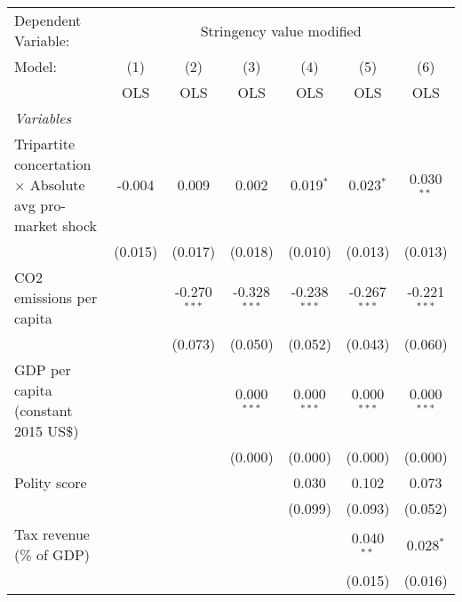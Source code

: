 
\begingroup
\centering
\begin{tabular}{lcccccc}
   \toprule
   Dependent Variable: & \multicolumn{6}{c}{Stringency value modified}\\
   Model:                                                          & (1)     & (2)            & (3)            & (4)            & (5)            & (6)\\  
                                                                   &  OLS    & OLS            & OLS            & OLS            & OLS            & OLS\\  
   \midrule
   \emph{Variables}\\
   Tripartite concertation $\times$ Absolute avg pro-market shock  & -0.004  & 0.009          & 0.002          & 0.019$^{*}$    & 0.023$^{*}$    & 0.030$^{**}$\\   
                                                                   & (0.015) & (0.017)        & (0.018)        & (0.010)        & (0.013)        & (0.013)\\   
   CO2 emissions per capita                                        &         & -0.270$^{***}$ & -0.328$^{***}$ & -0.238$^{***}$ & -0.267$^{***}$ & -0.221$^{***}$\\   
                                                                   &         & (0.073)        & (0.050)        & (0.052)        & (0.043)        & (0.060)\\   
   GDP per capita (constant 2015 US\$)                             &         &                & 0.000$^{***}$  & 0.000$^{***}$  & 0.000$^{***}$  & 0.000$^{***}$\\   
                                                                   &         &                & (0.000)        & (0.000)        & (0.000)        & (0.000)\\   
   Polity score                                                    &         &                &                & 0.030          & 0.102          & 0.073\\   
                                                                   &         &                &                & (0.099)        & (0.093)        & (0.052)\\   
   Tax revenue (\% of GDP)                                         &         &                &                &                & 0.040$^{**}$   & 0.028$^{*}$\\   
                                                                   &         &                &                &                & (0.015)        & (0.016)\\   

\end{tabular}
